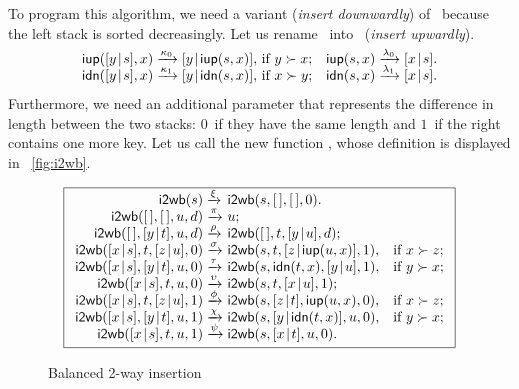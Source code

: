 To program this algorithm, we need a variant
 (\emph{insert downwardly})
of~ because the left stack is sorted
decreasingly. Let us rename~
into~ (\emph{insert upwardly}).
\begin{equation*}
\begin{array}{@{}r@{\;}l@{\;}lr@{\;}l@{\;}l@{}}
  \fun{iup}(\cons{y}{s},x)
& \xrightarrow{\smash{\kappa_0}}
& \cons{y}{\fun{iup}(s,x)},\,\text{if \(y \succ x\)};
& \fun{iup}(s,x)
& \xrightarrow{\smash{\lambda_0}} & \cons{x}{s}.\\
  \fun{idn}(\cons{y}{s},x)
& \xrightarrow{\smash{\kappa_1}}
& \cons{y}{\fun{idn}(s,x)},\,\text{if \(x \succ y\)};
& \fun{idn}(s,x)
& \xrightarrow{\smash{\lambda_1}} & \cons{x}{s}.
\end{array}
\end{equation*}
Furthermore, we need an additional parameter that represents the
difference in length between the two stacks: \(0\)~if they have the
same length and \(1\)~if the right contains one more key. Let us call
the new function
, whose
definition is displayed in \fig~\vref{fig:i2wb}.
\begin{figure}[t]
\begin{equation*}
\boxed{%
\begin{array}{r@{\;}l@{\;}ll}
\fun{i2wb}(s)
& \xrightarrow{\smash{\xi}} & \fun{i2wb}(s,\el,\el,0).\\
\fun{i2wb}(\el,\el,u,d)
& \xrightarrow{\smash{\pi}} & u;\\
\fun{i2wb}(\el,\cons{y}{t},u,d)
& \xrightarrow{\smash{\rho}} & \fun{i2wb}(\el,t,\cons{y}{u},d);\\
\fun{i2wb}(\cons{x}{s},t,\cons{z}{u},0)
& \xrightarrow{\smash{\sigma}} &
\fun{i2wb}(s,t,\cons{z}{\fun{iup}(u,x)},1),
& \text{if \(x \succ z\)};\\
\fun{i2wb}(\cons{x}{s},\cons{y}{t},u,0)
& \xrightarrow{\smash{\tau}} &
\fun{i2wb}(s,\fun{idn}(t,x),\cons{y}{u},1),
& \text{if \(y \succ x\)};\\
\fun{i2wb}(\cons{x}{s},t,u,0)
& \xrightarrow{\smash{\upsilon}} & \fun{i2wb}(s,t,\cons{x}{u},1);\\
\fun{i2wb}(\cons{x}{s},t,\cons{z}{u},1)
& \xrightarrow{\smash{\phi}}
& \fun{i2wb}(s,\cons{z}{t},\fun{iup}(u,x),0),
& \text{if \(x \succ z\)};\\
\fun{i2wb}(\cons{x}{s},\cons{y}{t},u,1)
& \xrightarrow{\smash{\chi}}
& \fun{i2wb}(s,\cons{y}{\fun{idn}(t,x)},u,0),
& \text{if \(y \succ x\)};\\
\fun{i2wb}(\cons{x}{s},t,u,1) & \xrightarrow{\smash{\psi}} &
\fun{i2wb}(s,\cons{x}{t},u,0).
\end{array}}
\end{equation*}
\caption{Balanced 2-way insertion \label{fig:i2wb}}
\end{figure}
